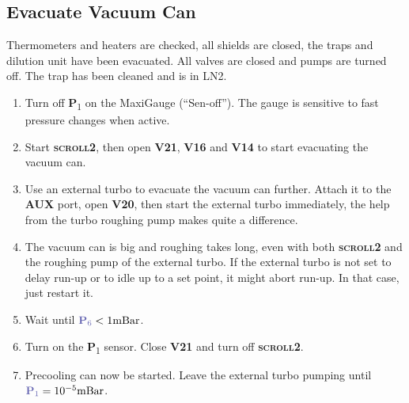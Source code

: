 \documentclass{article}[18pt,A4]
\newcommand{\mBar}{\mathrm{mBar}}
\newcommand{\thing}[1]{{\color{gray}\textsc{ \textbf{#1}}}}
\newcommand{\valve}[1]{{\color{gray}\textbf{V#1}}}
\newcommand{\pressure}[1]{{\color{pressurecolor}\textbf{P}\textsubscript{#1}}}
\begin{document}
\subsection{Evacuate Vacuum Can}
Thermometers and heaters are checked, all shields are closed, the traps and dilution unit have been evacuated.
All valves are closed and pumps are turned off.
The trap has been cleaned and is in LN2.
\begin{enumerate}
    \item Turn off \pressure{1} on the MaxiGauge (``Sen-off'').
    The gauge is sensitive to fast pressure changes when active.
    \item Start \thing{scroll2}, then open \valve{21}, \valve{16} and \valve{14} to start evacuating the vacuum can. 
    \item Use an external turbo to evacuate the vacuum can further.
    Attach it to the \thing{AUX} port, open \valve{20}, then start the external turbo immediately, the help from the turbo roughing pump makes quite a difference.
    \item The vacuum can is big and roughing takes long, even with both \thing{scroll2} and the roughing pump of the external turbo.
    If the external turbo is not set to delay run-up or to idle up to a set point, it might abort run-up. In that case, just restart it.
    \item Wait until $\pressure{6} < 1 \mBar$.
    \item Turn on the \pressure{1} sensor. Close \valve{21} and turn off \thing{scroll2}.
    \item Precooling can now be started. Leave the external turbo pumping until $\pressure{1} = 10^{-5} \mBar$. 
\end{enumerate}
\end{document}
